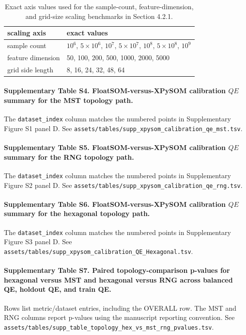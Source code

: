 \documentclass[10pt]{article} %
\begin{document}
\begin{table}[H]
\caption{Exact axis values used for the sample-count, feature-dimension, and grid-size scaling benchmarks in Section 4.2.1.}
\label{tab:s3}
\centering
\small
\begin{tabular}{ll}
\hline
scaling axis & exact values \\
\hline
sample count & $10^6$, $5 \times 10^6$, $10^7$, $5 \times 10^7$, $10^8$, $5 \times 10^8$, $10^9$ \\
feature dimension & 50, 100, 200, 500, 1000, 2000, 5000 \\
grid side length & 8, 16, 24, 32, 48, 64 \\
\hline
\end{tabular}
\end{table}

\paragraph*{Supplementary Table S4. FloatSOM-versus-XPySOM calibration $QE$ summary for the MST topology path.}
The \texttt{dataset\_index} column matches the numbered points in Supplementary Figure S1 panel D. See \texttt{assets/tables/supp\_xpysom\_calibration\_qe\_mst.tsv}.

\paragraph*{Supplementary Table S5. FloatSOM-versus-XPySOM calibration $QE$ summary for the RNG topology path.}
The \texttt{dataset\_index} column matches the numbered points in Supplementary Figure S2 panel D. See \texttt{assets/tables/supp\_xpysom\_calibration\_qe\_rng.tsv}.

\paragraph*{Supplementary Table S6. FloatSOM-versus-XPySOM calibration $QE$ summary for the hexagonal topology path.}
The \texttt{dataset\_index} column matches the numbered points in Supplementary Figure S3 panel D. See \texttt{assets/tables/supp\_xpysom\_calibration\_QE\_Hexagonal.tsv}.

\paragraph*{Supplementary Table S7. Paired topology-comparison p-values for hexagonal versus MST and hexagonal versus RNG across balanced QE, holdout QE, and train QE.}
Rows list metric/dataset entries, including the OVERALL row. The MST and RNG columns report p-values using the manuscript reporting convention. See \texttt{assets/tables/supp\_table\_topology\_hex\_vs\_mst\_rng\_pvalues.tsv}.
\end{document}
